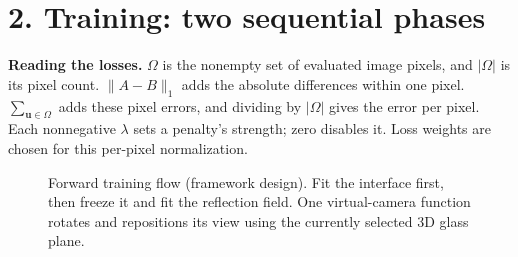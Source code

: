 \documentclass[10pt,a4paper]{article}
\newcommand{\GI}{\mathcal G_{\mathrm I}}
\newcommand{\GR}{\mathcal G_{\mathrm R}}
\newcommand{\uu}{\mathbf u}
\newcommand{\Om}{\Omega}
\begin{document}
\section*{2. Training: two sequential phases}
\textbf{Reading the losses.} $\Om$ is the nonempty set of evaluated image pixels, and $|\Om|$ is its pixel count. $\|A-B\|_1$ adds the absolute differences within one pixel. $\sum_{\uu\in\Om}$ adds these pixel errors, and dividing by $|\Om|$ gives the error per pixel. Each nonnegative $\lambda$ sets a penalty's strength; zero disables it. Loss weights are chosen for this per-pixel normalization.
\begin{figure}[H]
\centering
{}
\caption{Forward training flow (framework design). Fit the interface first, then freeze it and fit the reflection field. One virtual-camera function rotates and repositions its view using the currently selected 3D glass plane.}
\end{figure}
\end{document}
